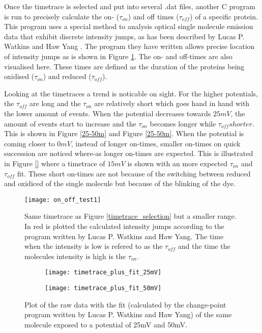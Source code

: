 \documentclass[twoside,single]{lion-msc}
\begin{document}
Once the timetrace is selected and put into several .dat files, another C program is run to precisely calculate the  on- ($\tau_{on}$) and off times ($\tau_{off}$) of a specific protein. This program uses a special method to analysis optical single molecule emission data that exhibit discrete intensity jumps, as has been described by Lucas P. Watkins and Haw Yang \cite{And2004}. The program they have written allows precise location of intensity jumps as is shown in Figure \ref{on_off_times}. The on- and off-times are also visualised here. These times are defined as the duration of the proteins being oxidised ($\tau_{on}$) and reduced ($\tau_{off}$).

Looking at the timetraces a trend is noticable on sight. For the higher potentials, the $\tau_{off}$ are long and the $\tau_{on}$ are relatively short which goes hand in hand with the lower amount of events. When the potential decreases towards $25mV$, the amount of events start to increase and the $\tau_{on}$ becomes longer while $\tau_{off} shorter$. This is shown in Figure \ref{25-50m} and Figure \ref{25-50m}. When the potential is coming closer to $0mV$, instead of longer on-times, smaller on-times on quick succession are noticed where-as longer on-times are expected. This is illustrated in Figure \ref{} where a timetrace of $15 mV$ is shown with an more expected $\tau_{on}$ and $\tau_{off}$ fit. These short on-times are not because of the switching between reduced and oxidiced of the single molecule but because of the blinking of the dye.

\begin{figure}[ht!]
\centering
\texttt{[image: on\_off\_test1]}
\caption{Same timetrace as Figure \ref{timetrace_selection} but a smaller range. In red is plotted the calculated intensity jumps according to the program written by Lucas P. Watkins and Haw Yang. The time when the intensity is low is refered to as the $\tau_{off}$ and the time the molecules intensity is high is the $\tau_{on}$.}
\label{on_off_times}
\end{figure}


\begin{figure}
\centering
   \begin{subfigure}[b]{1\textwidth}
   \texttt{[image: timetrace\_plus\_fit\_25mV]}

\end{subfigure}

\begin{subfigure}[b]{1\textwidth}
   \texttt{[image: timetrace\_plus\_fit\_50mV]}

\end{subfigure}

\caption{Plot of the raw data with the fit (calculated by the change-point program written by Lucas P. Watkins and Haw Yang) of the same molecule exposed to a potential of 25mV and 50mV.}
\label{25-50mV}
\end{figure}
\end{document}
